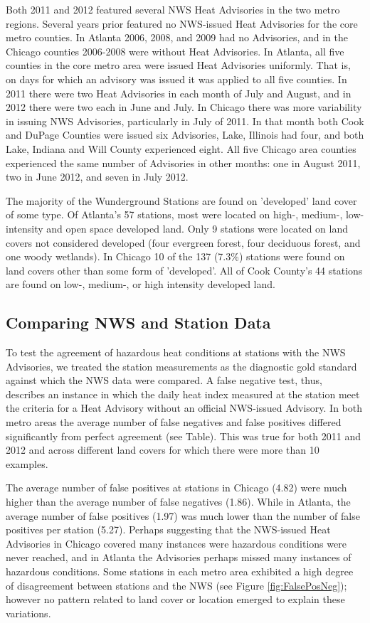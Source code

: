 \documentclass{ametsoc}
\begin{document}
Both 2011 and 2012 featured several NWS Heat Advisories in the two metro regions. Several years prior featured no NWS-issued Heat Advisories for the core metro counties. In Atlanta 2006, 2008, and 2009 had no Advisories, and in the Chicago counties 2006-2008 were without Heat Advisories. In Atlanta, all five counties in the core metro area were issued Heat Advisories uniformly. That is, on days for which an advisory was issued it was applied to all five counties. In 2011 there were two Heat Advisories in each month of July and August, and in 2012 there were two each in June and July. In Chicago there was more variability in issuing NWS Advisories, particularly in July of 2011. In that month both Cook and DuPage Counties were issued six Advisories, Lake, Illinois had four, and both Lake, Indiana and Will County experienced eight. All five Chicago area counties experienced the same number of Advisories in other months: one in August 2011, two in June 2012, and seven in July 2012. 

The majority of the Wunderground Stations are found on 'developed' land cover of some type. Of Atlanta's 57 stations, most were located on high-, medium-, low-intensity and open space developed land. Only 9 stations were located on land covers not considered developed (four evergreen forest, four deciduous forest, and one woody wetlands). In Chicago 10 of the 137 (7.3\%) stations were found on land covers other than some form of 'developed'. All of Cook County's 44 stations are found on low-, medium-, or high intensity developed land.   

\subsection{Comparing NWS and Station Data}\label{subsec:hyp1}

To test the agreement of hazardous heat conditions at stations with the NWS Advisories, we treated the station measurements as the diagnostic gold standard against which the NWS data were compared. A false negative test, thus, describes an instance in which the daily heat index measured at the station meet the criteria for a Heat Advisory without an official NWS-issued Advisory. In both metro areas the average number of false negatives and false positives differed significantly from perfect agreement (see Table). This was true for both 2011 and 2012 and across different land covers for which there were more than 10 examples. 

The average number of false positives at stations in Chicago (4.82) were much higher than the average number of false negatives (1.86).  While in Atlanta, the average number of false positives (1.97) was much lower than the number of false positives per station (5.27). Perhaps suggesting that the NWS-issued Heat Advisories in Chicago covered many instances were hazardous conditions were never reached, and in Atlanta the Advisories perhaps missed many instances of hazardous conditions. Some stations in each metro area exhibited a high degree of disagreement between stations and the NWS (see Figure \ref{fig:FalsePosNeg}); however no pattern related to land cover or location emerged to explain these variations. 
\end{document}
